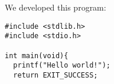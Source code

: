 \chapter{\solutionname}
We developed this program:
\begin{verbatim}
#include <stdlib.h>
#include <stdio.h>

int main(void){
  printf("Hello world!");
  return EXIT_SUCCESS;
\end{verbatim}
